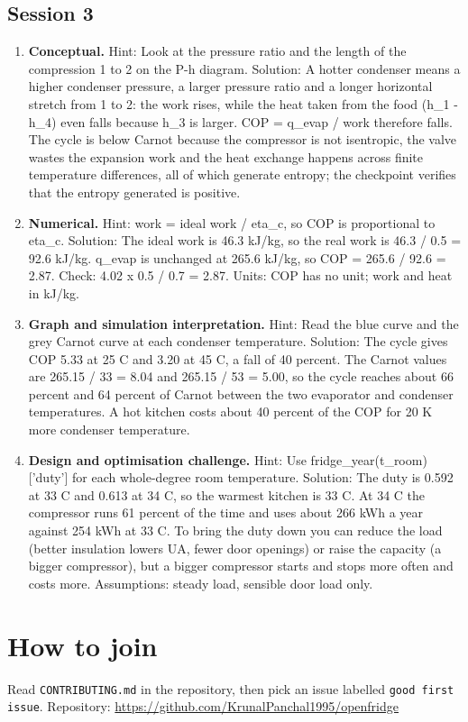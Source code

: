 \documentclass[11pt,a4paper]{article}
\begin{document}
\subsection*{Session 3}
\begin{enumerate}[nosep]
\item \textbf{Conceptual.} Hint: Look at the pressure ratio and the length of the compression 1 to 2 on the P-h diagram. Solution: A hotter condenser means a higher condenser pressure, a larger pressure ratio and a longer horizontal stretch from 1 to 2: the work rises, while the heat taken from the food (h\_1 - h\_4) even falls because h\_3 is larger. COP = q\_evap / work therefore falls. The cycle is below Carnot because the compressor is not isentropic, the valve wastes the expansion work and the heat exchange happens across finite temperature differences, all of which generate entropy; the checkpoint verifies that the entropy generated is positive.
\item \textbf{Numerical.} Hint: work = ideal work / eta\_c, so COP is proportional to eta\_c. Solution: The ideal work is 46.3 kJ/kg, so the real work is 46.3 / 0.5 = 92.6 kJ/kg. q\_evap is unchanged at 265.6 kJ/kg, so COP = 265.6 / 92.6 = 2.87. Check: 4.02 x 0.5 / 0.7 = 2.87. Units: COP has no unit; work and heat in kJ/kg.
\item \textbf{Graph and simulation interpretation.} Hint: Read the blue curve and the grey Carnot curve at each condenser temperature. Solution: The cycle gives COP 5.33 at 25 C and 3.20 at 45 C, a fall of 40 percent. The Carnot values are 265.15 / 33 = 8.04 and 265.15 / 53 = 5.00, so the cycle reaches about 66 percent and 64 percent of Carnot between the two evaporator and condenser temperatures. A hot kitchen costs about 40 percent of the COP for 20 K more condenser temperature.
\item \textbf{Design and optimisation challenge.} Hint: Use fridge\_year(t\_room)['duty'] for each whole-degree room temperature. Solution: The duty is 0.592 at 33 C and 0.613 at 34 C, so the warmest kitchen is 33 C. At 34 C the compressor runs 61 percent of the time and uses about 266 kWh a year against 254 kWh at 33 C. To bring the duty down you can reduce the load (better insulation lowers UA, fewer door openings) or raise the capacity (a bigger compressor), but a bigger compressor starts and stops more often and costs more. Assumptions: steady load, sensible door load only.
\end{enumerate}

\section{How to join}
Read \texttt{CONTRIBUTING.md} in the repository, then pick an issue labelled \texttt{good first issue}. Repository: \url{https://github.com/KrunalPanchal1995/openfridge}
\end{document}
